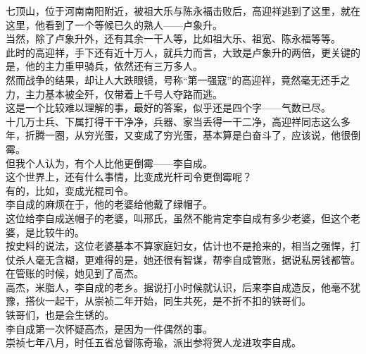 \begin{multicols}{\theparacolNo}
七顶山，位于河南南阳附近，被祖大乐与陈永福击败后，高迎祥逃到了这里，就在这里，他看到了一个等候已久的熟人——卢象升。\\

当然，除了卢象升外，还有其余一干人等，比如祖大乐、祖宽、陈永福等等。\\

此时的高迎祥，手下还有近十万人，就兵力而言，大致是卢象升的两倍，更关键的是，他的主力重甲骑兵，依然还有三万多人。\\

然而战争的结果，却让人大跌眼镜，号称“第一强寇”的高迎祥，竟然毫无还手之力，主力基本被全歼，仅带着上千号人夺路而逃。\\

这是一个比较难以理解的事，最好的答案，似乎还是四个字——气数已尽。\\

十几万士兵、下属打得干干净净，兵器、家当丢得一干二净，高迎祥同志这么多年，折腾一圈，从穷光蛋，又变成了穷光蛋，基本算是白奋斗了，应该说，他很倒霉。\\

但我个人认为，有个人比他更倒霉——李自成。\\

这个世界上，还有什么事情，比变成光杆司令更倒霉呢？\\

有的，比如，变成光棍司令。\\

李自成的麻烦在于，他的老婆给他戴了绿帽子。\\

这位给李自成送帽子的老婆，叫邢氏，虽然不能肯定李自成有多少老婆，但这个老婆，是比较牛的。\\

按史料的说法，这位老婆基本不算家庭妇女，估计也不是抢来的，相当之强悍，打仗杀人毫无含糊，更难得的是，她还很有智谋，帮李自成管账，据说私房钱都管。\\

在管账的时候，她见到了高杰。\\

高杰，米脂人，李自成的老乡。据说打小时候就认识，后来李自成造反，他毫不犹豫，搭伙一起干，从崇祯二年开始，同生共死，是不折不扣的铁哥们。\\

铁哥们，也是会生锈的。\\

李自成第一次怀疑高杰，是因为一件偶然的事。\\

崇祯七年八月，时任五省总督陈奇瑜，派出参将贺人龙进攻李自成。\\


\end{multicols}
